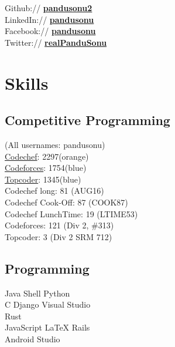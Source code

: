 \documentclass[letterpaper]{deedy-resume} %
\begin{document}
\begin{minipage}[t]{0.33\textwidth}
Github:// \href{https://github.com/pandusonu2}{\bf pandusonu2} \\
LinkedIn:// \href{https://www.linkedin.com/in/pandusonu}{\bf pandusonu} \\
Facebook:// \href{https://www.facebook.com/pandu.sonu}{\bf pandusonu} \\
Twitter:// \href{https://twitter.com/pandu_sonu} {\bf realPanduSonu}

\sectionspace %

\section{Skills}

\sectionspace

\subsection{Competitive Programming}
(All usernames: pandusonu) \\
\href{https://www.codechef.com/users/pandusonu}{Codechef}: 2297(orange)\\
\href{http://codeforces.com/profile/pandusonu}{Codeforces}: 1754(blue) \\
\href{https://www.topcoder.com/members/pandusonu/}{Topcoder}: 1345(blue)\\
Codechef long: 81 (AUG16)\\
Codechef Cook-Off: 87 (COOK87)\\
Codechef LunchTime: 19 (LTIME53)\\
Codeforces: 121 (Div 2, \#313)\\
Topcoder: 3 (Div 2 SRM 712)

\sectionspace

\subsection{Programming}

Java \textbullet{} Shell \textbullet{} Python \textbullet{} \\
C \textbullet{} Django \textbullet{} Visual Studio \\
\textbullet{} Rust \\

JavaScript \textbullet{} \LaTeX \textbullet{} Rails \textbullet{} \\
Android Studio




\end{minipage} %
\end{document}
